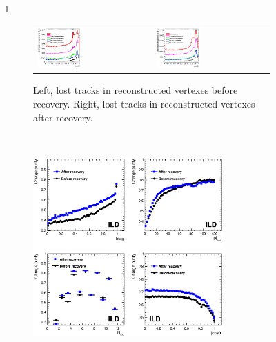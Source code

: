 \documentclass[preprint]{elsarticle}
\begin{document}
\begin{itemize}
\begin{figure}[!ht]
  \centering
  \begin{tabular}{l}
    \begin{subfigure}{\textwidth}
      \centering
      \begin{tabular}{ll}
        \centering
        \includegraphics[width=0.4\textwidth]{figures_Methods/beforeVR_ttbar.png} & \includegraphics[width=0.4\textwidth]{figures_Methods/afterVR_ttbar.png}\\
      \end{tabular}
      \caption{ Left, lost tracks in reconstructed vertexes before recovery. Right, lost tracks in reconstructed vertexes after recovery.}
      \label{vr_and_bquarkpurity_ttbar:a}
    \end{subfigure} \\
    \begin{subfigure}{\textwidth}
      \centering
      \includegraphics[width=0.8\textwidth]{figures_Methods/b_purity_VR_ttbar_l5.eps}

\end{subfigure}
\end{tabular}
\end{figure}
\end{itemize}
\end{document}
